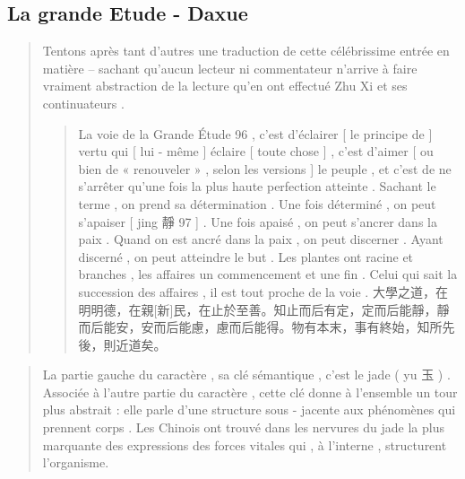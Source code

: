 \subsection{La grande Etude - Daxue}
 \begin{quote}

Tentons après tant d'autres une traduction de cette célébrissime entrée
en matière -- sachant qu'aucun lecteur ni commentateur n'arrive à faire
vraiment abstraction de la lecture qu'en ont effectué Zhu Xi et ses
continuateurs . 
\begin{quote}
    La voie de la Grande Étude 96 , c'est d'éclairer {[} le
principe de {]} vertu qui {[} lui - même {]} éclaire {[} toute chose {]}
, c'est d'aimer {[} ou bien de « renouveler » , selon les versions {]}
le peuple , et c'est de ne s'arrêter qu'une fois la plus haute
perfection atteinte . Sachant le terme , on prend sa détermination . Une
fois déterminé , on peut s'apaiser {[} jing 靜 97 {]} . Une fois apaisé
, on peut s'ancrer dans la paix . Quand on est ancré dans la paix , on
peut discerner . Ayant discerné , on peut atteindre le but . Les plantes
ont racine et branches , les affaires un commencement et une fin . Celui
qui sait la succession des affaires , il est tout proche de la voie .
大學之道，在明明德，在親[新]民，在止於至善。知止而后有定，定而后能靜，靜而后能安，安而后能慮，慮而后能得。物有本末，事有終始，知所先後，則近道矣。


\end{quote}


\end{quote}  \begin{quote}

La partie gauche du caractère , sa clé sémantique , c'est le jade ( yu 玉 )
. Associée à l'autre partie du caractère , cette clé donne à l'ensemble
un tour plus abstrait : elle parle d'une structure sous - jacente aux
phénomènes qui prennent corps . Les Chinois ont trouvé dans les nervures
du jade la plus marquante des expressions des forces vitales qui , à
l'interne , structurent l'organisme.

\end{quote} 
